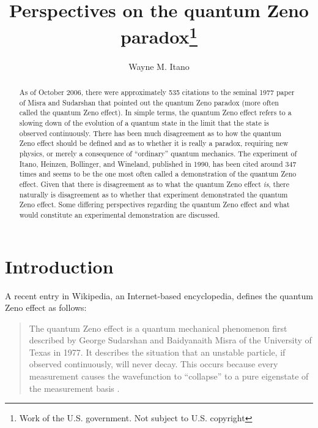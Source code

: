 \documentclass[12pt]{article}
\begin{document}
\title{Perspectives on the quantum Zeno paradox\footnote{Work of the U.S. government.  Not subject to U.S. copyright}}
\author{Wayne M. Itano}
\maketitle



\begin{abstract}
As of October 2006, there were approximately 535 citations to the
seminal 1977 paper of Misra and Sudarshan that pointed out the
quantum Zeno paradox (more often called the quantum Zeno effect). In
simple terms, the quantum Zeno effect refers to a slowing down of
the evolution of a quantum state in the limit that the state is
observed continuously. There has been much disagreement as to how
the quantum Zeno effect should be defined and as to whether it is
really a paradox, requiring new physics, or merely a consequence of
``ordinary'' quantum mechanics.  The experiment of Itano, Heinzen,
Bollinger, and Wineland, published in 1990, has been cited around
347 times and seems to be the one most often called a demonstration
of the quantum Zeno effect. Given that there is disagreement as to
what the quantum Zeno effect {\em is}, there naturally is
disagreement as to whether that experiment demonstrated the quantum
Zeno effect. Some differing perspectives regarding the quantum Zeno
effect and what would constitute an experimental demonstration are
discussed.

\end{abstract}

\section{Introduction}

A recent entry in  Wikipedia, an Internet-based encyclopedia,
defines the quantum Zeno effect as follows:

\begin{quote}The quantum Zeno effect is a quantum mechanical phenomenon
first described by George Sudarshan and Baidyanaith Misra of the
University of Texas in 1977. It describes the situation that an
unstable particle, if observed continuously, will never decay. This
occurs because every measurement causes the wavefunction to
``collapse'' to a pure eigenstate of the measurement basis
\cite{wiki}.
\end{quote}
\end{document}
